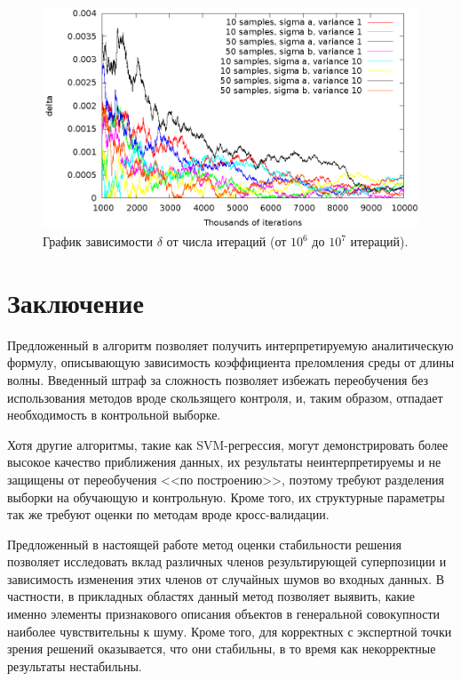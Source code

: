 \documentclass[11pt,a4paper]{article}
\theoremstyle{definition}
\begin{document}
\begin{figure}[h]
  \centering
  \includegraphics[scale=1.2]{figs/classic/variance_all_1000_all.eps}
  \caption{График зависимости $\delta$ от числа итераций (от $10^6$ до $10^7$ итераций).}
  \label{fig:classic_all_1000_all}
\end{figure}

\section{Заключение}

Предложенный в \cite{Rudoy13} алгоритм позволяет получить интерпретируемую аналитическую
формулу, описывающую зависимость коэффициента преломления среды от длины волны.
Введенный штраф за сложность позволяет избежать переобучения без использования методов
вроде скользящего контроля, и, таким образом, отпадает необходимость в контрольной выборке.

Хотя другие алгоритмы, такие как SVM-регрессия, могут демонстрировать более высокое
качество приближения данных, их результаты неинтерпретируемы и не защищены от переобучения
<<по построению>>, поэтому требуют разделения выборки на обучающую и контрольную. Кроме
того, их структурные параметры так же требуют оценки по методам вроде кросс-валидации.

Предложенный в настоящей работе метод оценки стабильности решения позволяет исследовать вклад различных
членов результирующей суперпозиции и зависимость изменения этих членов от
случайных шумов во входных данных. В частности, в прикладных областях данный метод позволяет
выявить, какие именно элементы признакового описания объектов в генеральной совокупности
наиболее чувствительны к шуму. Кроме того, для корректных с экспертной точки зрения
решений оказывается, что они стабильны, в то время как некорректные результаты нестабильны.

\FloatBarrier


%
%

\end{document}

